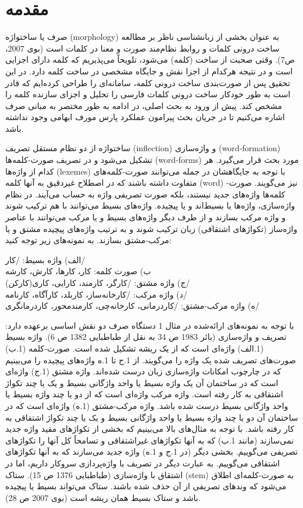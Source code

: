 \documentclass[12pt,onecolumn,a4paper]{article}
\begin{document}
    \section{مقدمه}
    صرف یا ساختواژه (morphology) به عنوان بخشی از زبان‏شناسی ناظر بر مطالعه ساخت درونی کلمات و روابط نظام‌مند صورت و معنا در کلمات است (بوی 2007، ص7). وقتی صحبت از ساخت (کلمه) می‌شود، تلویحاً می‌پذیریم که کلمه دارای اجزایی است و در نتیجه هرکدام از اجزا نقش و جایگاه مشخصی در ساخت کلمه دارد. در این تحقیق پس از صورت‌بندی ساخت درونی کلمه، سامانه‌ای را طراحی کرده‌ایم که قادر است به طور خودکار ساخت درونی کلمات فارسی را تحلیل و اجزای سازنده کلمه را مشخص کند. پیش از ورود به بحث اصلی، در ادامه به طور مختصر به مبانی صرف اشاره می‌کنیم تا در جریان بحث پیرامون عملکرد پارس مورف ابهامی وجود نداشته باشد.
    \par\noindent
    ساختواژه از دو نظام مستقل تصریف (inflection) و واژه‌سازی (word-formation) تشکیل می‌شود و در تصریف صورت-کلمه‌ها (word-forms) مورد بحث قرار می‌گیرد. هر کدام از واژه‌ها (lexemes) با توجه به جایگاهشان در جمله می‌توانند صورت-کلمه‌های متفاوت داشته باشند که در اصطلاح غیردقیق به آنها کلمه (word) نیز می‌گویند.  صورت-کلمه‌ها واژه‌های جدید نیستند، بلکه صورت تصریفی واژه‌ به حساب می‌آیند. در نظام واژه‌سازی، واژه‌ها یا بسیط‌اند و یا پیچیده. واژه‌های بسیط می‌توانند با هم ترکیب شوند و واژه مرکب بسازند و از طرف دیگر واژه‌های بسیط و یا مرکب می‌توانند با عناصر واژه‌ساز (تکواژهای اشتقاقی) زبان ترکیب شوند و به ترتیب واژه‌های پیچیده مشتق و یا مرکب-مشتق بسازند. به نمونه‌های زیر توجه کنید:
    \par\noindent
    الف) واژه بسیط: /کار/ \\
    ب) صورت کلمه: کار، کارها، کارش، کارشه \\
    ج) واژه مشتق: /کارگر، کارمند، کارایی، کاری(کارکن)/ \\
    د) واژه مرکب: /کارخانه‌ساز، کاربلد، کارآگاه، کارنامه/ \\
    ه) واژه مرکب-مشتق: /کاردرمانی، کارخانه‌چی، کارمندمحور، کاردرمانگری/ \\
    \par\noindent
    با توجه به نمونه‌های ارائه‌شده در مثال 1 دستگاه صرف دو نقش اساسی برعهده دارد: تصریف و واژه‌‌سازی (بائر 1983 ص 34 به نقل از طباطبایی 1382 ص 6). واژه بسیط (1.الف) واژه‌ای است که از یک ریشه تشکیل شده است. صورت-کلمه (1.ب) صورت‌های تصریف شده یک واژه را می‌گویند. از 1.ج تا 1.ه واژه‌های پیچیده را می‌بینیم که در چارچوب امکانات واژه‌سازی زبان درست شده‌اند. واژه مشتق (1.ج) واژه‌ای است که در ساختمان آن یک واژه بسیط یا واحد واژگانی بسیط و یک یا چند تکواژ اشتقاقی به کار رفته است. واژه مرکب واژه‌ای است که از دو یا چند واژه بسیط یا واحد واژگانی بسیط درست شده باشد. واژه مرکب-مشتق (1.ه) واژه‌ای است که در ساختمان آن دو یا چند واژه بسیط یا واحد واژگانی بسیط و یک یا چند تکواژ اشتقاقی به کار رفته باشد. با توجه به مثال‌های بالا می‌بینیم که بخشی از تکواژهای مقید واژه جدید نمی‌سازند (مانند 1.ب) که به آنها تکواژهای غیراشتقاقی و تسامحاً کل آنها را تکواژهای تصریفی می‌گوییم. بخشی دیگر (در 1.ج و 1.ه) واژه جدید می‌سازند که به آنها تکواژهای اشتقاقی می‌گوییم. به عبارت دیگر در تصریف با واژه‌پردازی سروکار داریم، اما در اشتقاق با واژه‌سازی (طباطبایی 1376 ص 15). ستاک (stem) به صورت-کلمه‌ای اطلاق می‌شود که وندهای تصریفی از آن حذف شده باشند. ستاک می‌تواند بسیط یا پیچیده باشد و ستاک بسیط همان ریشه است (بوی 2007 ص 28).
\end{document}
